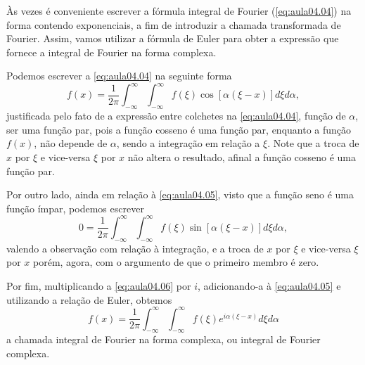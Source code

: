 


    Às vezes é conveniente escrever a fórmula integral de Fourier (\autoref{eq:aula04.04}) na forma contendo exponenciais, a fim de introduzir a chamada transformada de Fourier. Assim, vamos utilizar a fórmula de Euler para obter a expressão que fornece a integral de Fourier na forma complexa.

Podemos escrever a \autoref{eq:aula04.04} na seguinte forma
\begin{equation}\label{eq:aula04.05}
f(x) = \dfrac{1}{2\pi} 
\int_{-\infty}^{\infty}
\int_{-\infty}^{\infty}
f(\xi) \cos[\alpha(\xi - x)] d\xi d\alpha,
\end{equation}
justificada pelo fato de a expressão entre colchetes na
\autoref{eq:aula04.04}, função de $\alpha$, ser uma função par, pois a função cosseno é uma função par, enquanto a função $f(x)$, não
depende de $\alpha$, sendo a integração em relação a $\xi$. Note
que a troca de $x$ por $\xi$ e vice-versa $\xi$ por $x$ não altera o
resultado, afinal a função cosseno é uma função par.

Por outro lado, ainda em relação à \autoref{eq:aula04.05}, visto que a
função seno é uma função ímpar, podemos escrever
\begin{equation}\label{eq:aula04.06}
0 =
\dfrac{1}{2\pi} 
\int_{-\infty}^{\infty}
\int_{-\infty}^{\infty}
f(\xi) \sin[\alpha(\xi - x)] d\xi d\alpha,
\end{equation}
valendo a observação com relação à integração, e a troca de $x$ por $\xi$ e vice-versa $\xi$ por $x$ porém, agora, com o argumento de que o primeiro membro é zero.

Por fim, multiplicando a \autoref{eq:aula04.06} por $i$, adicionando-a à
\autoref{eq:aula04.05} e utilizando a relação de Euler, obtemos
\begin{equation}\label{eq:aula04.07}
f(x) = 
\dfrac{1}{2\pi} 
\int_{-\infty}^{\infty}
\int_{-\infty}^{\infty}
f(\xi) e^{i\alpha (\xi -x)}
d\xi d\alpha
\end{equation}
a chamada integral de Fourier na forma complexa, ou integral de Fourier complexa.

